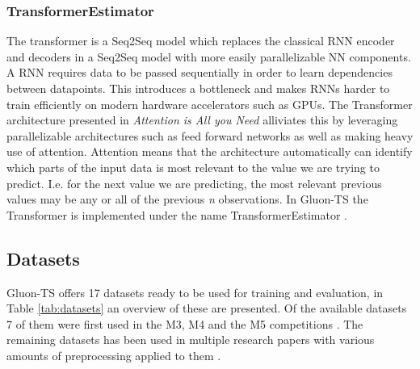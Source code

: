 \subsubsection{TransformerEstimator}
The transformer is a Seq2Seq model which replaces the classical RNN encoder and decoders in a Seq2Seq model with more easily parallelizable NN components. A RNN requires data to be passed sequentially in order to learn dependencies between datapoints. This introduces a bottleneck and makes RNNs harder to train efficiently on modern hardware accelerators such as GPUs. The Transformer architecture presented in \textit{Attention is All you Need} \cite{vaswani_attention_nodate} alliviates this by leveraging parallelizable architectures such as feed forward networks as well as making heavy use of attention. Attention means that the architecture automatically can identify which parts of the input data is most relevant to the value we are trying to predict\cite{vaswani_attention_nodate}. I.e. for the next value we are predicting, the most relevant previous values may be any or all of the previous \textit{n} observations.  In Gluon-TS the Transformer is implemented under the name TransformerEstimator \cite{gluonts-website}.

\subsection{Datasets}
Gluon-TS offers 17 datasets ready to be used for training and evaluation, in Table \ref{tab:datasets} an overview of these are presented. Of the available datasets 7 of them were first used in the M3, M4 and the M5 competitions \cite{makridakis_m4_2020,m3_competition,m5}. The remaining datasets has been used in multiple research papers with various amounts of preprocessing applied to them \cite{oreshkin_n_beats_2020,lai_modeling_2018,rangapuram_deep_2018,wen_multi-horizon_2018,wang_deep_2019,seq2seq}.

